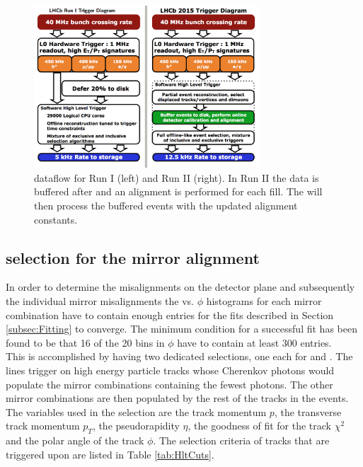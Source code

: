 \begin{figure}[htbp]
  \vspace{-0.1\baselineskip}
  \centering
  \includegraphics[width=0.75\textwidth]{figs/Online/dataflow}
  \vspace{-0.5\baselineskip}
  \caption{\lhcb dataflow for Run I (left) and Run II (right). In Run II the data is buffered after \hltone and an alignment is performed for each fill. The \hlttwo will then process the buffered events with the updated alignment constants.}
  \label{fig:dataflow}
  \vspace{-0.5\baselineskip}
\end{figure}


\subsection{\hltone selection for the \rich mirror alignment}
\label{subsec:HltForRich}
In order to determine the misalignments on the detector plane and subsequently the individual mirror misalignments the \deltatheta vs. $\phi$ histograms for each mirror combination have to contain enough entries for the fits described in Section \ref{subsec:Fitting} to converge. The minimum condition for a successful fit has been found to be that 16 of the 20 bins in $\phi$ have to contain at least 300 entries.\\
This is accomplished by having two dedicated \hltone selections, one each for \richone and \richtwo. The lines trigger on high energy particle tracks whose Cherenkov photons would populate the mirror combinations containing the fewest photons. The other mirror combinations are then populated by the rest of the tracks in the events.\\
The variables used in the selection are the track momentum $p$, the transverse track momentum $p_T$, the pseudorapidity $\eta$, the goodness of fit for the track $\chi^2$ and the polar angle of the track $\phi$. The selection criteria of tracks that are triggered upon are listed in Table \ref{tab:HltCuts}. \\


